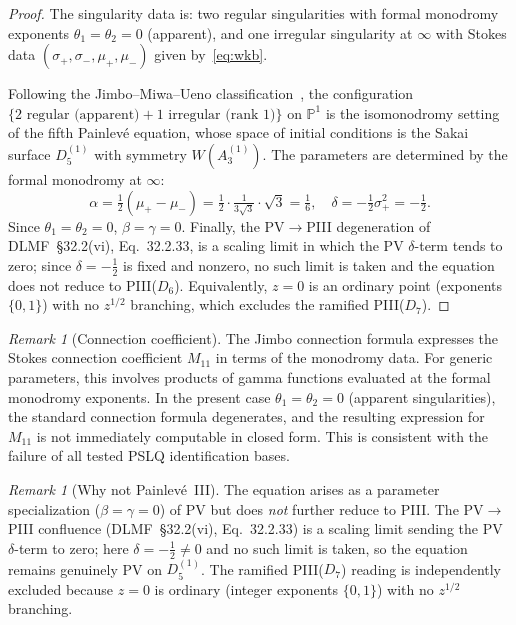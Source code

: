 \documentclass[11pt,a4paper]{article}
\theoremstyle{definition}
\theoremstyle{remark}
\newtheorem{remark}[theorem]{Remark}
\begin{document}
\begin{proof}
The singularity data is: two regular
singularities with formal monodromy
exponents $\theta_1 = \theta_2 = 0$
(apparent), and one irregular singularity
at $\infty$ with Stokes data
$(\sigma_+, \sigma_-, \mu_+, \mu_-)$
given by~\eqref{eq:wkb}.

Following the Jimbo--Miwa--Ueno
classification~\cite{jimbo1981}, the
configuration
$\{2 \text{ regular (apparent)} +
1 \text{ irregular (rank 1)}\}$ on
$\mathbb{P}^1$ is the isomonodromy setting
of the fifth Painlev\'e equation, whose
space of initial conditions is the Sakai
surface $D_5^{(1)}$ with symmetry
$W(A_3^{(1)})$.
The parameters are determined by the
formal monodromy at $\infty$:
\[
  \alpha = \tfrac{1}{2}(\mu_+ - \mu_-)
  = \tfrac{1}{2} \cdot \tfrac{1}{3\sqrt{3}}
  \cdot \sqrt{3}
  = \tfrac{1}{6},
  \quad \delta = -\tfrac{1}{2}\sigma_+^2
  = -\tfrac{1}{2}.
\]
Since $\theta_1 = \theta_2 = 0$,
$\beta = \gamma = 0$.
Finally, the PV$\to$PIII degeneration of
DLMF~\S32.2(vi), Eq.~32.2.33, is a scaling
limit in which the PV $\delta$-term tends to
zero; since $\delta=-\tfrac12$ is fixed and
nonzero, no such limit is taken and the
equation does not reduce to PIII($D_6$).
Equivalently, $z=0$ is an ordinary point
(exponents $\{0,1\}$) with no $z^{1/2}$
branching, which excludes the ramified
PIII($D_7$).
\end{proof}

\begin{remark}[Connection coefficient]
The Jimbo connection formula expresses the
Stokes connection coefficient $M_{11}$ in
terms of the monodromy data. For generic
parameters, this involves products of gamma
functions evaluated at the formal monodromy
exponents. In the present case
$\theta_1 = \theta_2 = 0$ (apparent
singularities), the standard connection
formula degenerates, and the resulting
expression for $M_{11}$ is not immediately
computable in closed form. This is
consistent with the failure of all tested
PSLQ identification bases.
\end{remark}

\begin{remark}[Why not Painlev\'e~III]
The equation arises as a parameter
specialization ($\beta=\gamma=0$) of PV but
does \emph{not} further reduce to PIII. The
PV$\to$PIII confluence (DLMF~\S32.2(vi),
Eq.~32.2.33) is a scaling limit sending the
PV $\delta$-term to zero; here
$\delta=-\tfrac12\neq0$ and no such limit is
taken, so the equation remains genuinely PV
on $D_5^{(1)}$. The ramified PIII($D_7$)
reading is independently excluded because
$z=0$ is ordinary (integer exponents
$\{0,1\}$) with no $z^{1/2}$ branching.
\end{remark}
\end{document}
